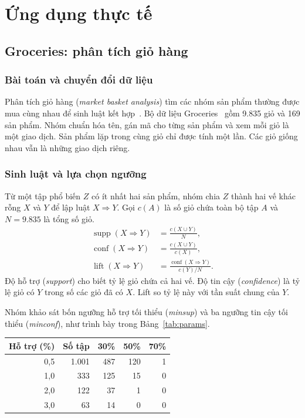 \section{Ứng dụng thực tế}\label{sec:applications}
\subsection{Groceries: phân tích giỏ hàng}\label{sec:groceries}
\subsubsection{Bài toán và chuyển đổi dữ liệu}
Phân tích giỏ hàng (\textit{market basket analysis}) tìm các nhóm
sản phẩm thường được mua cùng nhau để sinh luật kết hợp~\cite{agrawal}.
Bộ dữ liệu Groceries~\cite{groceries} gồm 9.835 giỏ và 169 sản phẩm.
Nhóm chuẩn hóa tên, gán mã cho từng sản phẩm và xem mỗi giỏ là
một giao dịch. Sản phẩm lặp trong cùng giỏ chỉ được tính một lần.
Các giỏ giống nhau vẫn là những giao dịch riêng.

\subsubsection{Sinh luật và lựa chọn ngưỡng}
Từ một tập phổ biến $Z$ có ít nhất hai sản phẩm, nhóm chia $Z$
thành hai vế khác rỗng $X$ và $Y$ để lập luật $X\Rightarrow Y$.
Gọi $c(A)$ là số giỏ chứa toàn bộ tập $A$ và $N=9.835$ là tổng số giỏ.
\begin{align}
\operatorname{supp}(X\Rightarrow Y)&=\frac{c(X\cup Y)}{N},\\
\operatorname{conf}(X\Rightarrow Y)&=\frac{c(X\cup Y)}{c(X)},\\
\operatorname{lift}(X\Rightarrow Y)&=\frac{\operatorname{conf}(X\Rightarrow Y)}{c(Y)/N}.
\end{align}
Độ hỗ trợ (\textit{support}) cho biết tỷ lệ giỏ chứa cả hai vế.
Độ tin cậy (\textit{confidence}) là tỷ lệ giỏ có $Y$ trong số các
giỏ đã có $X$. Lift so tỷ lệ này với tần suất chung của $Y$.

Nhóm khảo sát bốn ngưỡng hỗ trợ tối thiểu (\textit{minsup}) và ba
ngưỡng tin cậy tối thiểu (\textit{minconf}), như trình bày trong
Bảng~\ref{tab:params}.

\begin{reporttable}
\caption{Số tập phổ biến và số luật theo các ngưỡng hỗ trợ và tin cậy. Ba cột cuối là số luật tại từng minconf.}\label{tab:params}
\centering\footnotesize
\begin{tabular}{rrrrr}\toprule
Hỗ trợ (\%) & Số tập & 30\% & 50\% & 70\% \\\midrule
0,5 & 1.001 & 487 & 120 & 1 \\
1,0 & 333 & 125 & 15 & 0 \\
2,0 & 122 & 37 & 1 & 0 \\
3,0 & 63 & 14 & 0 & 0 \\
\bottomrule\end{tabular}
\end{reporttable}

